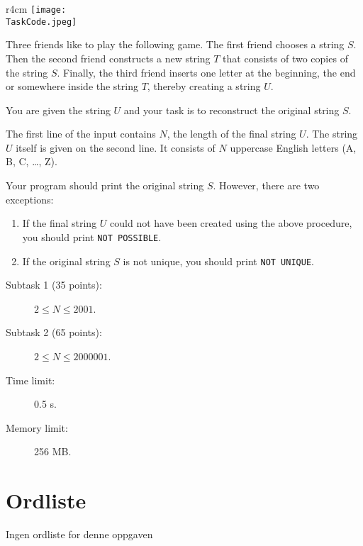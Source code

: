\documentclass{boi2014-no}
\renewcommand{\TaskCode}{friends}
\begin{document}
    \begin{wrapfigure}{r}{4cm}
        \vspace{-24pt}
		\texttt{[image: \\TaskCode.jpeg]}
	\end{wrapfigure}
    Three friends like to play the following game.
    The first friend chooses a string $S$.
    Then the second friend constructs a new string $T$ that consists of
    two copies of the string $S$. 
    Finally, the third friend inserts one letter at the beginning, the end or somewhere
    inside the string $T$, thereby creating a string $U$.

    \Task
    You are given the string $U$ and your task is to reconstruct the original string $S$.

    \Input
    The first line of the input contains $N$, the length of the final string $U$.
    The string $U$ itself is given on the second line. It consists of $N$
    uppercase English letters (A, B, C, \ldots{}, Z).

    \Output
    Your program should print the original string $S$.
    However, there are two exceptions:
    \begin{enumerate}
        \item If the final string $U$ could not have been created using the above
        procedure, you should print {\tt NOT POSSIBLE}.
        \item If the original string $S$ is not unique, you should print {\tt NOT
        UNIQUE}.
    \end{enumerate}

    \Examples


    \Scoring

    \begin{description}
        \item[Subtask 1 (35 points):] $2 \le N \le 2001$.
        \item[Subtask 2 (65 points):] $2 \le N \le 2000001$.
    \end{description}

    \Constraints

    \begin{description}
        \item[Time limit:] 0.5 s.
        \item[Memory limit:] 256 MB.
    \end{description}

    \FloatBarrier\section*{Ordliste}
    Ingen ordliste for denne oppgaven
\end{document}
